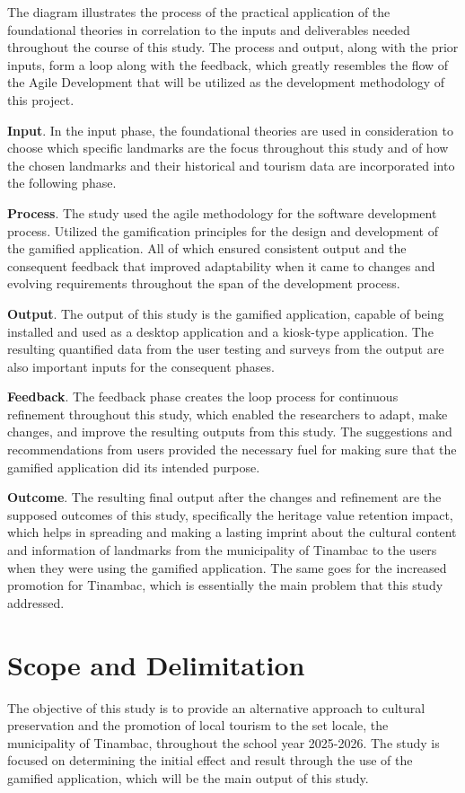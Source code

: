 \documentclass[11pt]{research}
\begin{document}
The diagram illustrates the process of the practical application of the foundational theories in correlation to the inputs and deliverables needed throughout the course of this study. The process and output, along with the prior inputs, form a loop along with the feedback, which greatly resembles the flow of the Agile Development that will be utilized as the development methodology of this project.

\textbf{Input}. In the input phase, the foundational theories are used in consideration to choose which specific landmarks are the focus throughout this study and of how the chosen landmarks and their historical and tourism data are incorporated into the following phase. 

\textbf{Process}. The study used the agile methodology for the  software development process. Utilized the gamification principles for the design and development of the gamified application. All of which ensured consistent output and the consequent feedback that improved adaptability when it came to changes and evolving requirements throughout the span of the development process.

\textbf{Output}. The output of this study is the gamified application, capable of being installed and used as a desktop application and a kiosk-type application. The resulting quantified data from the user testing and surveys from the output are also important inputs for the consequent phases.

\textbf{Feedback}. The feedback phase creates the loop process for continuous refinement throughout this study, which enabled the researchers to adapt, make changes, and improve the resulting outputs from this study. The suggestions and recommendations from users provided the necessary fuel for making sure that the gamified application did its intended purpose.

\textbf{Outcome}. The resulting final output after the changes and refinement are the supposed outcomes of this study, specifically the heritage value retention impact, which helps in spreading and making a lasting imprint about the cultural content and information of landmarks from the municipality of Tinambac to the users when they were using the gamified application. The same goes for the increased promotion for Tinambac, which is essentially the main problem that this study addressed.

\section{Scope and Delimitation}
The objective of this study is to provide an alternative approach to cultural preservation and the promotion of local tourism to the set locale, the municipality of Tinambac, throughout the school year 2025-2026. The study is focused on determining the initial effect and result through the use of the gamified application, which will be the main output of this study.
\end{document}
